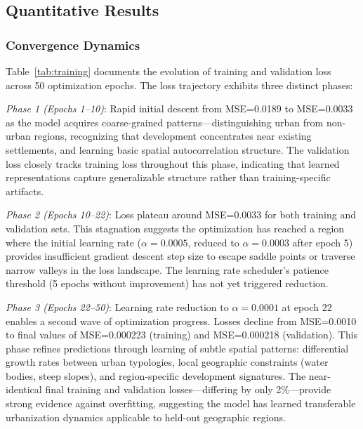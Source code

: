 \documentclass[conference]{IEEEtran}
\begin{document}
\subsection{Quantitative Results}

\subsubsection{Convergence Dynamics}
Table~\ref{tab:training} documents the evolution of training and validation loss across 50 optimization epochs. The loss trajectory exhibits three distinct phases:

\textit{Phase 1 (Epochs 1--10)}: Rapid initial descent from MSE=0.0189 to MSE=0.0033 as the model acquires coarse-grained patterns---distinguishing urban from non-urban regions, recognizing that development concentrates near existing settlements, and learning basic spatial autocorrelation structure. The validation loss closely tracks training loss throughout this phase, indicating that learned representations capture generalizable structure rather than training-specific artifacts.

\textit{Phase 2 (Epochs 10--22)}: Loss plateau around MSE=0.0033 for both training and validation sets. This stagnation suggests the optimization has reached a region where the initial learning rate ($\alpha=0.0005$, reduced to $\alpha=0.0003$ after epoch 5) provides insufficient gradient descent step size to escape saddle points or traverse narrow valleys in the loss landscape. The learning rate scheduler's patience threshold (5 epochs without improvement) has not yet triggered reduction.

\textit{Phase 3 (Epochs 22--50)}: Learning rate reduction to $\alpha=0.0001$ at epoch 22 enables a second wave of optimization progress. Losses decline from MSE=0.0010 to final values of MSE=0.000223 (training) and MSE=0.000218 (validation). This phase refines predictions through learning of subtle spatial patterns: differential growth rates between urban typologies, local geographic constraints (water bodies, steep slopes), and region-specific development signatures. The near-identical final training and validation losses---differing by only 2\%---provide strong evidence against overfitting, suggesting the model has learned transferable urbanization dynamics applicable to held-out geographic regions.
\end{document}
